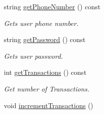 \begin{DoxyCompactItemize}
string \hyperlink{class_user_a4d59412a7d7411dd8c8127adc9e80fae}{get\+Phone\+Number} () const 
\begin{DoxyCompactList}\small\item\em Gets user phone number. \end{DoxyCompactList}\item 
string \hyperlink{class_user_a3f39e6b48da6b769692bf71f26104a6a}{get\+Password} () const 
\begin{DoxyCompactList}\small\item\em Gets user password. \end{DoxyCompactList}\item 
int \hyperlink{class_user_a1efdb237b12f0e41874351c98c2bb40f}{get\+Transactions} () const 
\begin{DoxyCompactList}\small\item\em Get number of Transactions. \end{DoxyCompactList}\item 
\hypertarget{class_user_a78c6774d65e2e8f411d26ff48d8dcae9}{}void \hyperlink{class_user_a78c6774d65e2e8f411d26ff48d8dcae9}{increment\+Transactions} ()\label{class_user_a78c6774d65e2e8f411d26ff48d8dcae9}


\end{DoxyCompactItemize}

